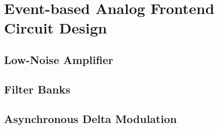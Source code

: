 \chapter{Event-based Analog Frontend Circuit Design}
\label{chapter:cdsign}

\section{Low-Noise Amplifier}
\section{Filter Banks}
\section{Asynchronous Delta Modulation}

